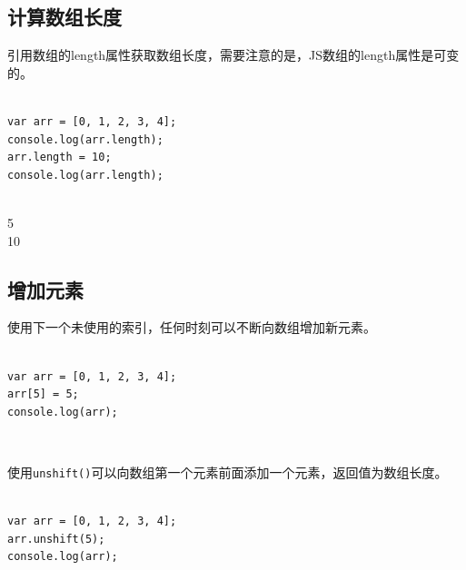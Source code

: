 \subsection{计算数组长度}

引用数组的length属性获取数组长度，需要注意的是，JS数组的length属性是可变的。 \\

 \\

\begin{lstlisting}[style=htmlcssjs]
var arr = [0, 1, 2, 3, 4];
console.log(arr.length);
arr.length = 10;
console.log(arr.length);
\end{lstlisting}

\begin{tcolorbox}
	 \\
	5 \\
	10
\end{tcolorbox}

\subsection{增加元素}

使用下一个未使用的索引，任何时刻可以不断向数组增加新元素。 \\

 \\

\begin{lstlisting}[style=htmlcssjs]
var arr = [0, 1, 2, 3, 4];
arr[5] = 5;
console.log(arr);
\end{lstlisting}

\begin{tcolorbox}
	 \\
	\text{[0, 1, 2, 3, 4, 5]}
\end{tcolorbox}

使用\lstinline|unshift()|可以向数组第一个元素前面添加一个元素，返回值为数组长度。 \\

 \\

\begin{lstlisting}[style=htmlcssjs]
var arr = [0, 1, 2, 3, 4];
arr.unshift(5);
console.log(arr);
\end{lstlisting}

\begin{tcolorbox}
	 \\
	\text{[5, 0, 1, 2, 3, 4]}
\end{tcolorbox}

